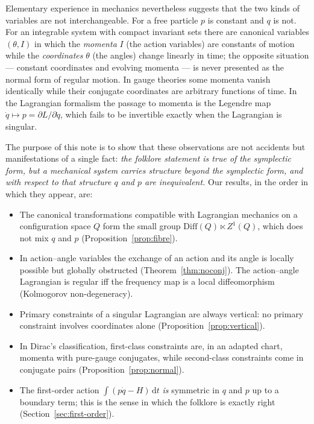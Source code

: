 \documentclass[11pt,a4paper]{article}
\theoremstyle{definition}
\theoremstyle{remark}
\newcommand{\dd}{\mathrm{d}}
\begin{document}
Elementary experience in mechanics nevertheless suggests that the two kinds of variables are not interchangeable.
For a free particle $p$ is constant and $q$ is not.
For an integrable system with compact invariant sets there are canonical variables $(\theta,I)$ in which the \emph{momenta} $I$ (the action variables) are constants of motion while the \emph{coordinates} $\theta$ (the angles) change linearly in time; the opposite situation --- constant coordinates and evolving momenta --- is never presented as the normal form of regular motion.
In gauge theories some momenta vanish identically while their conjugate coordinates are arbitrary functions of time.
In the Lagrangian formalism the passage to momenta is the Legendre map $\dot q\mapsto p=\partial L/\partial\dot q$, which fails to be invertible exactly when the Lagrangian is singular.

The purpose of this note is to show that these observations are not accidents but manifestations of a single fact: \emph{the folklore statement is true of the symplectic form, but a mechanical system carries structure beyond the symplectic form, and with respect to that structure $q$ and $p$ are inequivalent.}
Our results, in the order in which they appear, are:
\begin{itemize}
\item[\textbf{R1}] The canonical transformations compatible with Lagrangian mechanics on a configuration space $Q$ form the small group $\mathrm{Diff}(Q)\ltimes Z^1(Q)$, which does not mix $q$ and $p$ (Proposition~\ref{prop:fibre}).
\item[\textbf{R2}] In action--angle variables the exchange of an action and its angle is locally possible but globally obstructed (Theorem~\ref{thm:noconj}). The action--angle Lagrangian is regular iff the frequency map is a local diffeomorphism (Kolmogorov non-degeneracy).
\item[\textbf{R3}] Primary constraints of a singular Lagrangian are always vertical: no primary constraint involves coordinates alone (Proposition~\ref{prop:vertical}).
\item[\textbf{R4}] In Dirac's classification, first-class constraints are, in an adapted chart, momenta with pure-gauge conjugates, while second-class constraints come in conjugate pairs (Proposition~\ref{prop:normal}).
\item[\textbf{R5}] The first-order action $\int(p\dot q-H)\,\dd t$ \emph{is} symmetric in $q$ and $p$ up to a boundary term; this is the sense in which the folklore is exactly right (Section~\ref{sec:first-order}).
\end{itemize}
\end{document}
